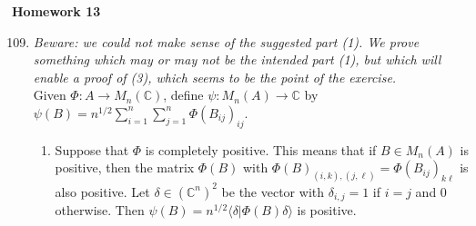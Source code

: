 \documentclass[a4paper,10pt]{report}
\newcommand{\ggen}[1]{\langle#1\rangle}
\newcommand{\C}{\mathbb{C}}
\begin{document}

\pagestyle{fancy}	
\fancyhf{} %
\setlength{\headheight}{60pt}

\begin{center}
	\textbf{Homework 13}
\end{center}
\begin{enumerate}
		\setcounter{enumi}{108}
	\item \textit{Beware: we could not make sense of the suggested part (1). We prove something which may or may not be the intended part (1), but which will enable a proof of (3), which seems to be the point of the exercise.}\\
		Given $\Phi:A\to M_n(\C)$, define $\psi:M_n(A)\to\C$ by $\psi(B)=n^{1/2}\sum_{i=1}^n\sum_{j=1}^n\Phi(B_{ij})_{ij}$. 
		\begin{enumerate}
			\item Suppose that $\Phi$ is completely positive. This means that if $B\in M_n(A)$ is positive, then the matrix $\Phi(B)$ with $\Phi(B)_{(i,k),(j,\ell)}=\Phi(B_{ij})_{k\ell}$ is also positive. Let $\delta\in(\C^n)^2$ be the vector with $\delta_{i,j}=1$ if $i=j$ and $0$ otherwise. Then $\psi(B)=n^{1/2}\ggen{\delta|\Phi(B)\delta}$ is positive.


\end{enumerate}
\end{enumerate}
\end{document}
